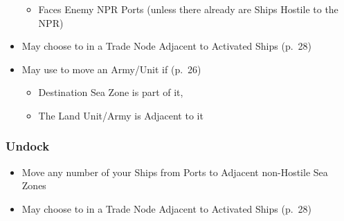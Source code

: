 \documentclass[10pt]{article}
\begin{document}
\begin{itemize}
\begin{itemize}
		\item Faces Enemy NPR Ports (unless there already are Ships Hostile to the NPR)
	\end{itemize}
	\item May choose to  in a Trade Node Adjacent to Activated Ships (p.~28)
	\item {}May use  to move an Army/Unit if (p.~26)
	\begin{itemize}
		\item Destination Sea Zone is part of it, 
		\item The Land Unit/Army is Adjacent to it
	\end{itemize}
\end{itemize}

\subsubsection*{Undock}
\begin{itemize}
	\item Move any number of your Ships from Ports to Adjacent non-Hostile Sea Zones
	\item May choose to  in a Trade Node Adjacent to Activated Ships (p.~28)
\end{itemize}

\newlength{\arrowPortOneTurnY} \setlength{\arrowPortOneTurnY}{120mm}
\end{document}
